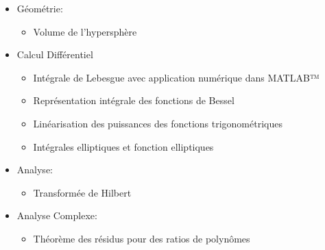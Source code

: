 \begin{itemize}
\begin{itemize}
				\item Modèle de Poisson pour la distance spatiale moyenne (2D)
				\item Corr\'elation canonique
				\item G-test de p\'eriodicit\'e
				\item Copula Gaussien et de Student
				\item ANOVA à facteur fixe hi\'erarchique
				\item Introduction à la MANOVA
				\item Th\'eorème des valeurs extrêmes
				\item Th\'eorie des sondages
				\item Modèles lin\'eaires g\'en\'eralis\'es (Gauss, Poissson, Binomial N\'egatif, Gamma)
				\item R\'egression PLS (moindres carr\'es partiels)
				\item Moindres carr\'es en deux \'etapes (2SLS)
				\item R\'egression logique
				\item Chi-carr\'e ajust\'e
				\item Probabilit\'e des fonctions g\'en\'eratrices
			\end{itemize}
		\item G\'eom\'etrie:
			\begin{itemize}
				\item Volume de l'hypersphère
			\end{itemize}
		\item Calcul Diff\'erentiel
			\begin{itemize}
				\item Int\'egrale de Lebesgue avec application num\'erique dans MATLAB™
				\item Repr\'esentation int\'egrale des fonctions de Bessel
				\item Lin\'earisation des puissances des fonctions trigonom\'etriques
				\item Int\'egrales elliptiques et fonction elliptiques
			\end{itemize}
		\item Analyse: 
			\begin{itemize}
				\item Transform\'ee de Hilbert
			\end{itemize}
		\item Analyse Complexe: 
			\begin{itemize}
				\item Th\'eorème des r\'esidus pour des ratios de polynômes

\end{itemize}
\end{itemize}
